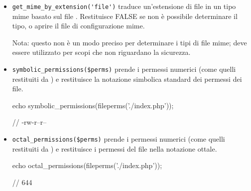 \begin{itemize}
\item \verb|get_mime_by_extension('file')| traduce un'estensione di file in un tipo mime basato sul file . Restituisce FALSE se non è possibile determinare il tipo, o aprire il file di configurazione mime.


Nota: questo non è un modo preciso per determinare i tipi di file mime; deve essere utilizzato per scopi che non riguardano la sicurezza.

\item \verb|symbolic_permissions($perms)| prende i permessi numerici (come quelli restituiti da ) e restituisce la notazione simbolica standard dei permessi dei file.

\begin{code}
echo symbolic_permissions(fileperms('./index.php'));

// -rw-r--r--
\end{code}

\item \verb|octal_permissions($perms)| prende i permessi numerici (come quelli restituiti da ) e restituisce i permessi del file nella notazione ottale.

\begin{code}
echo octal_permissions(fileperms('./index.php'));

// 644
\end{code}
\end{itemize}